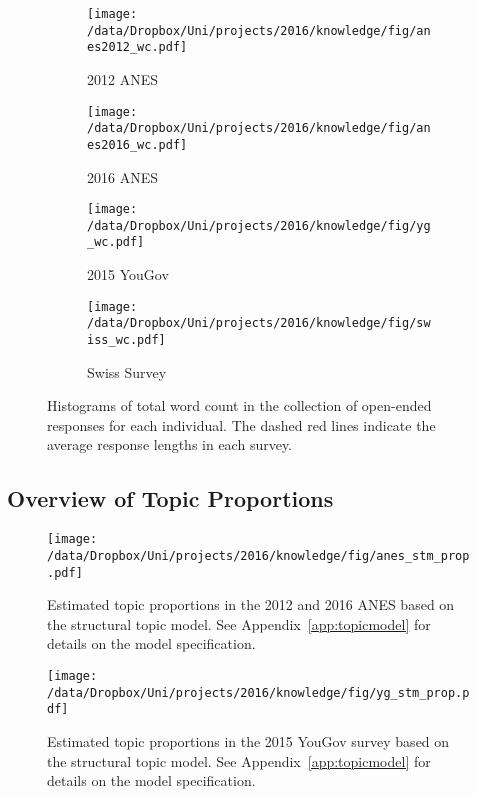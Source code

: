 \begin{figure*}[h]
    \centering
    \begin{subfigure}[t]{0.49\textwidth}
        \centering
        \texttt{[image: /data/Dropbox/Uni/projects/2016/knowledge/fig/anes2012\_wc.pdf]}
        \caption{2012 ANES}
    \end{subfigure}%
	\begin{subfigure}[t]{0.49\textwidth}
        \centering
        \texttt{[image: /data/Dropbox/Uni/projects/2016/knowledge/fig/anes2016\_wc.pdf]}
        \caption{2016 ANES}
    \end{subfigure}%
    
    \begin{subfigure}[t]{0.49\textwidth}
        \centering
        \texttt{[image: /data/Dropbox/Uni/projects/2016/knowledge/fig/yg\_wc.pdf]}
        \caption{2015 YouGov}
    \end{subfigure}
    \begin{subfigure}[t]{0.49\textwidth}
         \centering
         \texttt{[image: /data/Dropbox/Uni/projects/2016/knowledge/fig/swiss\_wc.pdf]}
         \caption{Swiss Survey}
    \end{subfigure}
    \caption[Histograms of total word count in open-ended responses]{Histograms of total word count in the collection of open-ended responses for each individual. The dashed red lines indicate the average response lengths in each survey.}\label{fig:wc}
\end{figure*}


\clearpage
\subsection{Overview of Topic Proportions}

\begin{figure}[h]\centering
\texttt{[image: /data/Dropbox/Uni/projects/2016/knowledge/fig/anes\_stm\_prop.pdf]}
\caption[Estimated topic proportions in the 2012 and 2016 ANES based on the structural topic model]{Estimated topic proportions in the 2012 and 2016 ANES based on the structural topic model. See Appendix~\ref{app:topicmodel} for details on the model specification.}\label{fig:anes_stm_prop}
\end{figure}

\begin{figure}[h]\centering
\texttt{[image: /data/Dropbox/Uni/projects/2016/knowledge/fig/yg\_stm\_prop.pdf]}
\caption[Estimated topic proportions in the 2015 YouGov survey based on the structural topic model]{Estimated topic proportions in the 2015 YouGov survey based on the structural topic model. See Appendix~\ref{app:topicmodel} for details on the model specification.}\label{fig:yg_stm_prop}
\end{figure}

